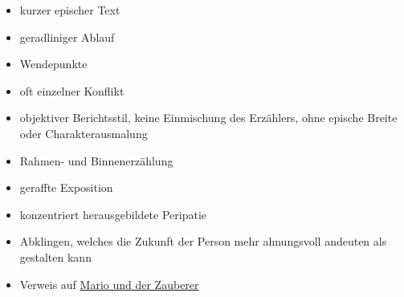 \begin{itemize}
    \item kurzer epischer Text
    \item geradliniger Ablauf
    \item Wendepunkte
    \item oft einzelner Konflikt
    \item objektiver Berichtsstil, keine Einmischung des Erzählers, ohne epische Breite oder Charakterausmalung
    \item Rahmen- und Binnenerzählung
    \item geraffte Exposition
    \item konzentriert herausgebildete Peripatie
    \item Abklingen, welches die Zukunft der Person mehr ahnungsvoll andeuten als gestalten kann
    \item Verweis auf \hyperref[sec:mario]{Mario und der Zauberer}
\end{itemize}

